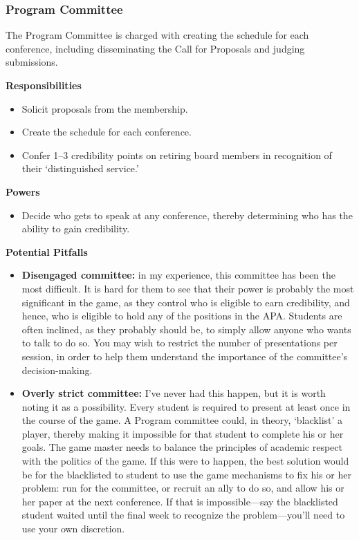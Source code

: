 \begin{refsection}
\begin{itemize}
\end{itemize}

\subsubsection{Program Committee}
\label{programcommittee}

The Program Committee is charged with creating the schedule for each conference, including disseminating the Call for Proposals and judging submissions. 

\textbf{Responsibilities}

\begin{itemize}
\item Solicit proposals from the membership.

\item Create the schedule for each conference.

\item Confer 1--3 credibility points on retiring board members in recognition of their ‘distinguished service.’

\end{itemize}

\textbf{Powers}

\begin{itemize}
\item Decide who gets to speak at any conference, thereby determining who has the ability to gain credibility.

\end{itemize}

\textbf{Potential Pitfalls}

\begin{itemize}
\item \textbf{Disengaged committee:} in my experience, this committee has been the most difficult. It is hard for them to see that their power is probably the most significant in the game, as they control who is eligible to earn credibility, and hence, who is eligible to hold any of the positions in the APA. Students are often inclined, as they probably should be, to simply allow anyone who wants to talk to do so. You may wish to restrict the number of presentations per session, in order to help them understand the importance of the committee’s decision-making.

\item \textbf{Overly strict committee:} I’ve never had this happen, but it is worth noting it as a possibility. Every student is required to present at least once in the course of the game. A Program committee could, in theory, ‘blacklist’ a player, thereby making it impossible for that student to complete his or her goals. The game master needs to balance the principles of academic respect with the politics of the game. If this were to happen, the best solution would be for the blacklisted to student to use the game mechanisms to fix his or her problem: run for the committee, or recruit an ally to do so, and allow his or her paper at the next conference. If that is impossible---say the blacklisted student waited until the final week to recognize the problem---you’ll need to use your own discretion.


\end{itemize}
\end{refsection}
